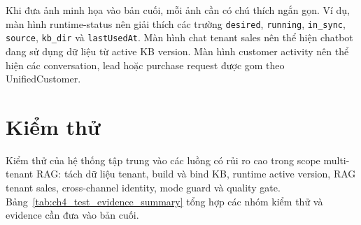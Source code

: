 \documentclass[../DoAn.tex]{subfiles}
\begin{document}
Khi đưa ảnh minh họa vào bản cuối, mỗi ảnh cần có chú thích ngắn gọn. Ví dụ, màn hình runtime-status nên giải thích các trường \texttt{desired}, \texttt{running}, \texttt{in\_sync}, \texttt{source}, \texttt{kb\_dir} và \texttt{lastUsedAt}. Màn hình chat tenant sales nên thể hiện chatbot đang sử dụng dữ liệu từ active KB version. Màn hình customer activity nên thể hiện các conversation, lead hoặc purchase request được gom theo UnifiedCustomer.

\section{Kiểm thử}
\label{section:4.4}

Kiểm thử của hệ thống tập trung vào các luồng có rủi ro cao trong scope multi-tenant RAG: tách dữ liệu tenant, build và bind KB, runtime active version, RAG tenant sales, cross-channel identity, mode guard và quality gate. Bảng~\ref{tab:ch4_test_evidence_summary} tổng hợp các nhóm kiểm thử và evidence cần đưa vào bản cuối.
\end{document}
